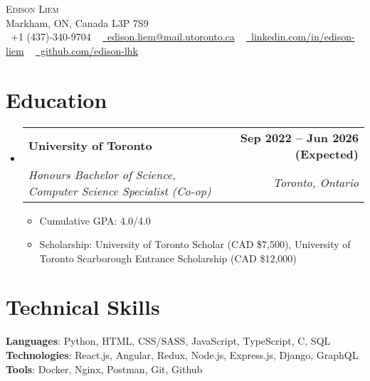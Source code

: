 \documentclass[letterpaper,11pt]{article}
\makeatletter
\newcommand{\resumeItem}[1]{
  \item\small{
    {#1 \vspace{-2pt}}
  }
}
\newcommand{\resumeSubheading}[4]{
  \vspace{-2pt}\item
    \begin{tabular*}{1.0\textwidth}[t]{l@{\extracolsep{\fill}}r}
      \textbf{#1} & \textbf{\small #2} \\
      \textit{\small#3} & \textit{\small #4} \\
    \end{tabular*}\vspace{-7pt}
}
\newcommand{\resumeSubHeadingListStart}{\begin{itemize}[leftmargin=0.0in, label={}]}
\newcommand{\resumeSubHeadingListEnd}{\end{itemize}}
\newcommand{\resumeItemListStart}{\begin{itemize}}
\newcommand{\resumeItemListEnd}{\end{itemize}\vspace{-5pt}}
\makeatother
\begin{document}

\begin{center}
    {\Huge \scshape Edison Liem} \\ \vspace{5pt}
    Markham, ON, Canada L3P 7S9 \\ \vspace{7pt}
    \small \raisebox{-0.1\height}\faPhone\ +1 (437)-340-9704 ~ \href{mailto:edison.liem@mail.utoronto.ca}{\raisebox{-0.2\height}\faEnvelope\  edison.liem@mail.utoronto.ca} ~
    \href{https://linkedin.com/in/edison-liem/}{\raisebox{-0.2\height}\faLinkedin\ linkedin.com/in/edison-liem}  ~
    \href{https://github.com/edison-lhk}{\raisebox{-0.2\height}\faGithub\ github.com/edison-lhk}
\end{center}


\section{Education}
  \resumeSubHeadingListStart
    \resumeSubheading
      {University of Toronto}{Sep 2022 -- Jun 2026 (Expected)}
      {Honours Bachelor of Science, Computer Science Specialist (Co-op)}{Toronto, Ontario}
      \resumeItemListStart
      \resumeItem{Cumulative GPA: 4.0/4.0}
      \resumeItem{Scholarship: University of Toronto Scholar (CAD \$7,500), University of Toronto Scarborough Entrance Scholarship (CAD \$12,000)}
      \resumeItemListEnd
  \resumeSubHeadingListEnd

\section{Technical Skills}
\vspace{2pt}
 \begin{itemize}[leftmargin=0.15in, label={}]
    \small{\item{
     \textbf{Languages}{: Python, HTML, CSS/SASS, JavaScript, TypeScript, C, SQL} \\
     \vspace{2pt}
     \textbf{Technologies}{: React.js, Angular, Redux, Node.js, Express.js, Django, GraphQL} \\
     \vspace{2pt}
     \textbf{Tools}{: Docker, Nginx, Postman, Git, Github} \\
    }}
 \end{itemize}
\end{document}
